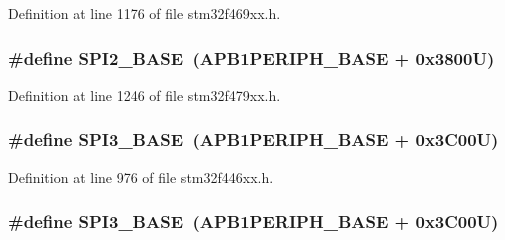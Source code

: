 Definition at line 1176 of file stm32f469xx.\+h.

\subsubsection[{\texorpdfstring{S\+P\+I2\+\_\+\+B\+A\+SE}{SPI2_BASE}}]{\setlength{\rightskip}{0pt plus 5cm}\#define S\+P\+I2\+\_\+\+B\+A\+SE~({\bf A\+P\+B1\+P\+E\+R\+I\+P\+H\+\_\+\+B\+A\+SE} + 0x3800\+U)}\hypertarget{group___peripheral__memory__map_gac3e357b4c25106ed375fb1affab6bb86}{}\label{group___peripheral__memory__map_gac3e357b4c25106ed375fb1affab6bb86}


Definition at line 1246 of file stm32f479xx.\+h.

\subsubsection[{\texorpdfstring{S\+P\+I3\+\_\+\+B\+A\+SE}{SPI3_BASE}}]{\setlength{\rightskip}{0pt plus 5cm}\#define S\+P\+I3\+\_\+\+B\+A\+SE~({\bf A\+P\+B1\+P\+E\+R\+I\+P\+H\+\_\+\+B\+A\+SE} + 0x3\+C00\+U)}\hypertarget{group___peripheral__memory__map_gae634fe8faa6922690e90fbec2fc86162}{}\label{group___peripheral__memory__map_gae634fe8faa6922690e90fbec2fc86162}


Definition at line 976 of file stm32f446xx.\+h.

\subsubsection[{\texorpdfstring{S\+P\+I3\+\_\+\+B\+A\+SE}{SPI3_BASE}}]{\setlength{\rightskip}{0pt plus 5cm}\#define S\+P\+I3\+\_\+\+B\+A\+SE~({\bf A\+P\+B1\+P\+E\+R\+I\+P\+H\+\_\+\+B\+A\+SE} + 0x3\+C00\+U)}\hypertarget{group___peripheral__memory__map_gae634fe8faa6922690e90fbec2fc86162}{}\label{group___peripheral__memory__map_gae634fe8faa6922690e90fbec2fc86162}


